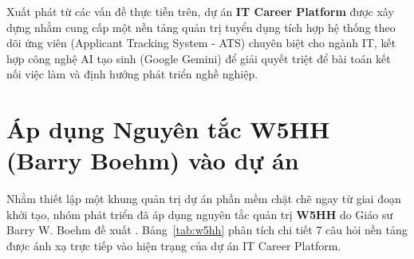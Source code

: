 Xuất phát từ các vấn đề thực tiễn trên, dự án \textbf{IT Career Platform} được xây dựng nhằm cung cấp một nền tảng quản trị tuyển dụng tích hợp hệ thống theo dõi ứng viên (Applicant Tracking System - ATS) chuyên biệt cho ngành IT, kết hợp công nghệ AI tạo sinh (Google Gemini) để giải quyết triệt để bài toán kết nối việc làm và định hướng phát triển nghề nghiệp.

\section{Áp dụng Nguyên tắc W5HH (Barry Boehm) vào dự án}
\label{sec:w5hh}

Nhằm thiết lập một khung quản trị dự án phần mềm chặt chẽ ngay từ giai đoạn khởi tạo, nhóm phát triển đã áp dụng nguyên tắc quản trị \textbf{W5HH} do Giáo sư Barry W. Boehm đề xuất \cite{boehm1996}. Bảng~\ref{tab:w5hh} phân tích chi tiết 7 câu hỏi nền tảng được ánh xạ trực tiếp vào hiện trạng của dự án IT Career Platform.

